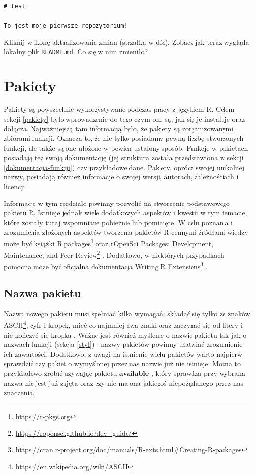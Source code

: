 \documentclass[paper=6in:9in,pagesize=pdftex,headinclude=on,footinclude=on,10pt]{scrbook}
\DeclareRobustCommand{\href}[2]{#2\footnote{\url{#1}}}
\begin{document}
\begin{verbatim}
# test

To jest moje pierwsze repozytorium!
\end{verbatim}

Kliknij w ikonę aktualizowania zmian (strzałka w dół).
Zobacz jak teraz wygląda lokalny plik \texttt{README.md}.
Co się w nim zmieniło?

\hypertarget{tworzenie-pakietow}{%
\chapter{Pakiety}\label{tworzenie-pakietow}}

Pakiety są powszechnie wykorzystywane podczas pracy z językiem R.
Celem sekcji \ref{pakiety} było wprowadzenie do tego czym one są, jak się je instaluje oraz dołącza.
Najważniejszą tam informacją było, że pakiety są zorganizowanymi zbiorami funkcji.
Oznacza to, że nie tylko posiadamy pewną liczbę stworzonych funkcji, ale także są one ułożone w pewien ustalony sposób.
Funkcje w pakietach posiadają też swoją dokumentację (jej struktura została przedstawiona w sekcji \ref{dokumentacja-funkcji}) czy przykładowe dane.
Pakiety, oprócz swojej unikalnej nazwy, posiadają również informacje o swojej wersji, autorach, zależnościach i licencji.

Informacje w tym rozdziale powinny pozwolić na stworzenie podstawowego pakietu R.
Istnieje jednak wiele dodatkowych aspektów i kwestii w tym temacie, które zostały tutaj wspomniane pobieżnie lub pominięte.
W celu poznania i zrozumienia złożonych aspektów tworzenia pakietów R cennymi źródłami wiedzy może być książki \href{https://r-pkgs.org}{R packages} \citep{wickham2015r} oraz \href{https://ropensci.github.io/dev_guide/}{rOpenSci Packages: Development, Maintenance, and Peer Review} \citep{ropensci_2019_2554759}.
Dodatkowo, w niektórych przypadkach pomocna może być oficjalna dokumentacja \href{https://cran.r-project.org/doc/manuals/R-exts.html\#Creating-R-packages}{Writing R Extensions} \citep{team1999writing}.

\hypertarget{nazwa-pakietu}{%
\section{Nazwa pakietu}\label{nazwa-pakietu}}

Nazwa nowego pakietu musi spełniać kilka wymagań: składać się tylko ze znaków \href{https://en.wikipedia.org/wiki/ASCII}{ASCII}, cyfr i kropek, mieć co najmniej dwa znaki oraz zaczynać się od litery i nie kończyć się kropką \citep{team1999writing}.
Ważne jest również myślenie o nazwie pakietu tak jak o nazwach funkcji (sekcja \ref{styl}) - nazwy pakietów powinny ułatwiać zrozumienie ich zawartości.
Dodatkowo, z uwagi na istnienie wielu pakietów warto najpierw sprawdzić czy pakiet o wymyślonej przez nas nazwie już nie istnieje.
Można to przykładowo zrobić używając pakietu \textbf{available} \citep{R-available}, który sprawdza przy wybrana nazwa nie jest już zajęta oraz czy nie ma ona jakiegoś niepożądanego przez nas znaczenia.
\end{document}
